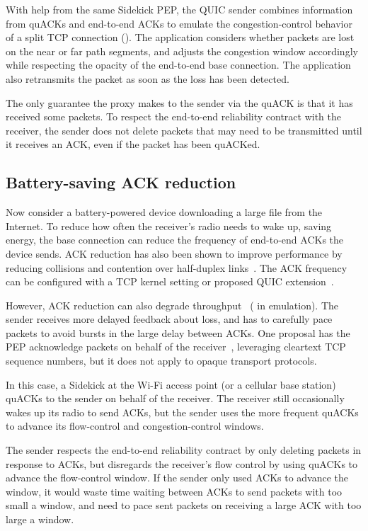 With help from the same Sidekick PEP, the QUIC sender combines information from
quACKs and end-to-end ACKs to emulate the congestion-control behavior of a
split TCP connection (). The
application considers whether packets are lost on the near or far path
segments, and adjusts the congestion window accordingly while respecting the
opacity of the end-to-end base connection. The application also retransmits the
packet as soon as the loss has been detected.

The only guarantee the proxy makes to the sender via the quACK is that it has
received some packets. To respect the end-to-end reliability contract with the
receiver, the sender does not delete packets that may need to be transmitted
until it receives an ACK, even if the packet has been quACKed.

\subsection{Battery-saving ACK reduction}

Now consider a battery-powered device downloading a large file from the
Internet. To reduce how often the receiver's
radio needs to wake up, saving energy, the base connection can reduce the
frequency of end-to-end ACKs the device sends.
ACK reduction has also been shown to improve performance by reducing collisions
and contention over half-duplex links~\cite{custura2023reducing,li2020tack}.
The ACK frequency can be configured with a TCP kernel setting or proposed
QUIC extension~\cite{ietf-quic-ack-frequency-07}.

However, ACK reduction can also degrade throughput~\cite{custura2023reducing,custura2020impact}
( in emulation).
The sender receives more delayed feedback about loss, and has to carefully
pace packets to avoid bursts in the large delay between ACKs.
One proposal has the PEP acknowledge packets on behalf of the
receiver~\cite{kliazovich2012arqproxy}, leveraging cleartext TCP sequence
numbers, but it does not apply to opaque transport protocols.

In this case, a Sidekick at the Wi-Fi access point (or a cellular base station)
quACKs to the sender on behalf of the receiver. The receiver still occasionally
wakes up its radio to send ACKs, but the sender uses the more frequent quACKs
to advance its flow-control and congestion-control windows.

The sender respects the end-to-end reliability contract by only deleting packets
in response to ACKs, but disregards the receiver's flow control by using quACKs
to advance the flow-control window. If the sender only used ACKs to advance the
window, it would waste time waiting between ACKs to send packets with too small
a window, and need to pace sent packets on receiving a large ACK with too large
a window.

